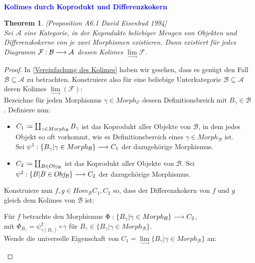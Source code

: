 \documentclass[10pt,a4paper]{report}
\newcommand{\ModulsOfDifferenzials}{David Eisenbud 1994}
\newcounter{Aussage}[chapter]
\newtheorem{theorem}[Aussage]{Theorem}
\newcommand{\functionfront}[3]{\nolinebreak{#1:#2 \longrightarrow #3}}
\newcommand{\colimes}[0]{\lim\limits_{ \longrightarrow }}
\newcommand*{\defeq}{\mathrel{\vcenter{\baselineskip0.5ex \lineskiplimit0pt
                     \hbox{\scriptsize.}\hbox{\scriptsize.}}}%
                     =}
\begin{document}
\ \\
\textcolor{blue}{\textbf{Kolimes durch Koprodukt und Differenzkokern}}
\begin{theorem}\label{Kolimes durch Koprodukt und Differenzkokern} \textit{[Proposition A6.1 \ModulsOfDifferenzials]}\\
Sei $\mathcal{A}$ eine Kategorie, in der Koprodukte beliebiger Mengen von Objekten und Differenzkokerne von je zwei Morphismen existieren. Dann existiert für jedes Diagramm $\functionfront{\mathcal{F}}{\mathcal{B}}{\mathcal{A}}$ dessen Kolimes $\colimes \mathcal{F}$.
\end{theorem}
\begin{proof}
In \cref{Vereinfachung des Kolimes} haben wir gesehen, dass es genügt den Fall $\mathcal{B} \subseteq \mathcal{A}$ zu betrachten. Konstruiere also für eine beliebige Unterkategorie $\mathcal{B} \subseteq \mathcal{A}$ deren Kolimes $\colimes(\mathcal{F})$:\\
Bezeichne für jeden Morphismus $\gamma \in Morph_{\mathcal{C}}$ dessen Definitionsbreich mit $B_{\gamma} \in \mathcal{B}$. Definiere nun:
\begin{itemize}
\item $C_1 \defeq \coprod_{\gamma \in Morph_{\mathcal{B}}} B_{\gamma}$ ist das Koprodukt aller Objekte von $\mathcal{B}$, in dem jedes Objekt so oft vorkommt, wie es Definitionsbereich eines $\gamma \in Morph_{\mathcal{B}}$ ist.\\
Sei $\functionfront{\psi^1}{\lbrace B_{\gamma} \vert \gamma \in Morph_{\mathcal{B}}\rbrace}{C_1}$ der dazugehörige Morphismus.
\item $C_2 \defeq \coprod_{B \in Obj_\mathcal{B}}$ ist das Koprodukt aller Objekte von $\mathcal{B}$. Sei $\functionfront{\psi^2}{\lbrace B \vert B \in Obj_\mathcal{B} \rbrace}{C_2}$ der dazugehörige Morphismus.
\end{itemize}
Konstruiere nun $f,g \in Hom_{\mathcal{B}}{C_1,C_2}$ so, dass der Differenzkokern von $f$ und $g$ gleich dem Kolimes von $\mathcal{B}$ ist:
\begin{center}
Für $f$ betrachte den Morphismus $\functionfront{\Phi}{\lbrace B_{\gamma} \vert \gamma \in Morph_{\mathcal{B}}\rbrace}{C_2}$,\\
mit $\Phi_{B_{\gamma}} = \psi^2_{\gamma(B_{\gamma})} \circ \gamma$ für $B_{\gamma} \in \lbrace B_{\gamma} \vert \gamma \in Morph_{\mathcal{B}}\rbrace$.\\
Wende die universelle Eigenschaft von $C_1 = \colimes \lbrace B_{\gamma} \vert \gamma \in Morph_{\mathcal{B}}\rbrace$ an:\\

\end{center}
\end{proof}
\end{document}
